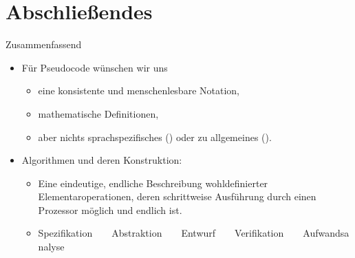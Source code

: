 \section{Abschließendes}
{\SummaryFrame
\begin{frame}[t]{Zusammenfassend}
\pause \printBibCommand
\vfill\vfill %
\begin{itemize}[<+(1)->]
    \itemsep14pt
    \item Für Pseudocode wünschen wir uns \begin{itemize}
        \itemsep1pt
        \item eine konsistente und menschenlesbare Notation,
        \item mathematische Definitionen,
        \item aber nichts sprachspezifisches () oder zu allgemeines ().
    \end{itemize}
    \item Algorithmen und deren Konstruktion: \begin{itemize}
        \itemsep1pt
        \item Eine eindeutige, endliche Beschreibung wohldefinierter Elementaroperationen, deren schrittweise Ausführung durch einen Prozessor möglich und endlich ist.
        \item \def\t{~~\faAngleRight~~}Spezifikation\t Abstraktion\t Entwurf\t Verifikation\t Aufwandsanalyse
    \end{itemize}
\end{itemize}
\end{frame}
}


\iffull\fi
